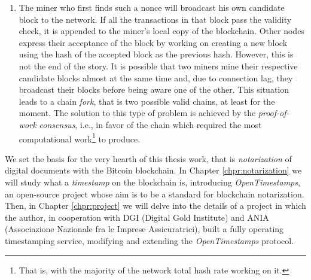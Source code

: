 \begin{enumerate}
    \begin{mydef}{\bf (Bitcoin proof-of-work)}.
        \label{def:btc-pow}
        The Bitcoin proof-of-work consists of finding a special number $x$ called nonce s.t. the double SHA256 of the candidate block header falls below a given threshold\textup{\footnote{More precisely, the difficulty $d$ is calculated as: $d=\frac{\text{difficulty\_1\_target}}{\text{current\_target}}$. Traditionally, the \textit{difficulty\_1\_target} represents a hash where the leading 32 bits are zero and the rest are one, known as \textit{pool difficulty}, or \textit{pdiff}. Thus, the threshold value appears as $\frac{2^{224}}{d}$ and not $\frac{2^{256}}{d}$. In addition, the mining threshold is adaptively adjusted every 2016 blocks to achieve an average goal of a block 10 minutes (i.e. every 2 weeks).}}:
        $$F_{d}(c,x) \rightarrow \text{SHA256}(\text{SHA256}(\underbrace{... \| \text{prev\_block\_header\_hash} \| ... \| x}_{\text{Candidate Block Header}})) < \frac{2^{224}}{d}.$$
    \end{mydef}
    
    \item The miner who first finds such a nonce will broadcast his own candidate block to the network. If all the transactions in that block pass the validity check, it is appended to the miner's local copy of the blockchain. Other nodes express their acceptance of the block by working on creating a new block using the hash of the accepted block as the previous hash. However, this is not the end of the story. It is possible that two miners mine their respective candidate blocks almost at the same time and, due to connection lag, they broadcast their blocks before being aware one of the other. This situation leads to a chain \textit{fork}, that is two possible valid chains, at least for the moment. The solution to this type of problem is achieved by the \textit{proof-of-work consensus}, i.e., in favor of the chain which required the most computational work\footnote{That is, with the majority of the network total hash rate working on it.} to produce.

\end{enumerate}

\bigskip
\noindent
We set the basis for the very hearth of this thesis work, that is \textit{notarization} of digital documents with the Bitcoin blockchain. In Chapter \ref{chpr:notarization} we will study what a \textit{timestamp} on the blockchain is, introducing \textit{OpenTimestamps}, an open-source project whose aim is to be a standard for blockchain notarization. Then, in Chapter \ref{chpr:project} we will delve into the details of a project in which the author, in cooperation with DGI (Digital Gold Institute) and ANIA (Associazione Nazionale fra le Imprese Assicuratrici), built a fully operating timestamping service, modifying and extending the \textit{OpenTimestamps} protocol.